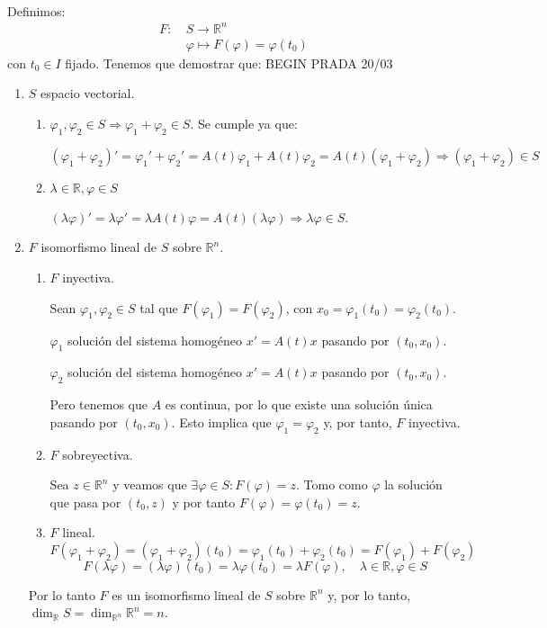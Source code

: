 \documentclass{article}
\makeatletter
\theoremstyle{theorem-style}  %
\theoremstyle{definition-style}
\theoremstyle{example-style}
\renewenvironment{proof}[1][\proofname]{\par
	\pushQED{\qed}%
	\normalfont \topsep6\p@\@plus6\p@\relax
	\list{}{%
		\settowidth{\leftmargin}{\quad:\hskip\labelsep}%
		\setlength{\labelwidth}{0pt}%
		\setlength{\itemindent}{-\leftmargin}%
	}%
	\item[\hskip\labelsep\itshape#1\@addpunct{:}]\ignorespaces
}{%
	\popQED\endlist\@endpefalse
}
\makeatother
\begin{document}
\begin{proof}\ \\
	Definimos:
	\begin{align*}
		F : \ &S \longrightarrow \mathbb{R}^n \\
		&\varphi \longmapsto F(\varphi) = \varphi (t_0)
	\end{align*}
	con $t_0 \in I$ fijado. Tenemos que demostrar que:
BEGIN PRADA 20/03
	\begin{enumerate}
		\item $ S $ espacio vectorial. 
		\begin{enumerate}[\quad i)]
			\item $ \varphi_1, \varphi_2 \in S \Rightarrow \varphi_1 + \varphi_2 \in S$. Se cumple ya que:
			
			$ (\varphi_1 + \varphi_2)' =\varphi_1'+\varphi_2'=A(t)\varphi_1 +A(t)\varphi_2 = A(t)(\varphi_1 + \varphi_2)\Rightarrow (\varphi_1+\varphi_2)\in S$
			\item $ \lambda\in \mathbb{R}, \varphi\in S $
			
			$ (\lambda \varphi)'=\lambda \varphi'=\lambda A(t)\varphi=A(t)(\lambda \varphi)\Rightarrow \lambda\varphi\in S $.
		\end{enumerate}
		\item $ F $ isomorfismo lineal de $ S $ sobre $ \mathbb{R}^n $.
		\begin{enumerate}[\quad i)]
			\item $ F $ inyectiva. 
			
			Sean $ \varphi_1,\varphi_2 \in S $ tal que $ F(\varphi_1)=F(\varphi_2) $, con $ x_0=\varphi_1(t_0)=\varphi_2(t_0) $.
			
			$ \varphi_1 $ solución del sistema homogéneo $ x'=A(t)x $ pasando por $ (t_0,x_0) $.
			
			$ \varphi_2 $ solución del sistema homogéneo $ x'=A(t)x $ pasando por $ (t_0,x_0) $.
			
			Pero tenemos que $A$ es continua, por lo que existe una solución única pasando por $ (t_0,x_0) $. Esto implica que $\varphi_1=\varphi_2$ y, por tanto, $F$ inyectiva.
			\item $ F $ sobreyectiva. 
			
			Sea $ z \in \mathbb{R}^n $ y veamos que $ \exists \varphi \in S : F(\varphi)=z $. Tomo como $ \varphi $ la solución que pasa por $ (t_0, z) $ y por tanto $ F(\varphi)=\varphi(t_0)=z $.	
			\item $ F $ lineal. 
			\[  F(\varphi_1+\varphi_2)=(\varphi_1+\varphi_2)(t_0)=\varphi_1(t_0)+\varphi_2(t_0)=F(\varphi_1)+F(\varphi_2)  \]
			\[ F(\lambda\varphi)=(\lambda\varphi)(t_0)=\lambda \varphi(t_0)= \lambda F(\varphi), \quad \lambda \in \mathbb{R}, \varphi \in S \]	
			
		\end{enumerate}
		Por lo tanto $ F $ es un isomorfismo lineal de $ S $ sobre $ \mathbb{R}^n $ y, por lo tanto, $\dim_\mathbb{R}S=\dim_{\mathbb{R}^n}\mathbb{R}^n=n $.
	\end{enumerate}
\end{proof}
\end{document}
